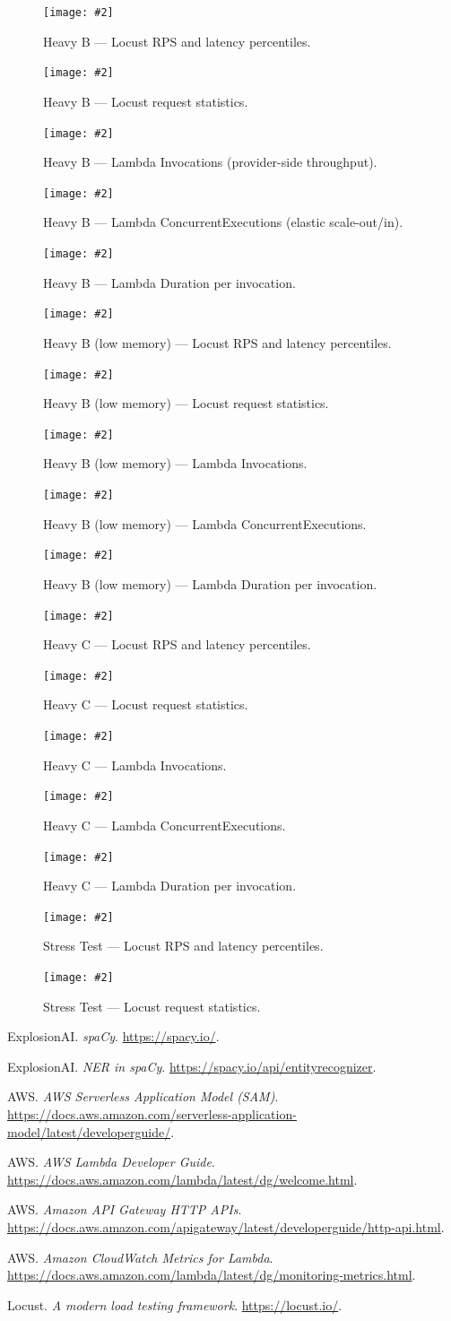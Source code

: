 \documentclass[11pt,a4paper]{article}
\newcommand{\scenariofig}[4][\linewidth]{%
  \begin{figure}[htbp]
    \centering
    \texttt{[image: \#2]}
    \caption{#3}
    \label{#4}
  \end{figure}%
}
\begin{document}
\scenariofig[0.8\textwidth]{figures/hB - Charts.png}{Heavy B — Locust RPS and latency percentiles.}{fig:hb-charts}
\scenariofig[0.9\textwidth]{figures/hB - Stats.png}{Heavy B — Locust request statistics.}{fig:hb-stats}
\scenariofig{figures/hB - Invocations.png}{Heavy B — Lambda Invocations (provider-side throughput).}{fig:hb-invocations}
\scenariofig{figures/hB - ConcEx.png}{Heavy B — Lambda ConcurrentExecutions (elastic scale-out/in).}{fig:hb-conc}
\scenariofig{figures/hB - Duration.png}{Heavy B — Lambda Duration per invocation.}{fig:hb-duration}

\scenariofig[0.8\textwidth]{figures/hBl - Charts.png}{Heavy B (low memory) — Locust RPS and latency percentiles.}{fig:hbl-charts}
\scenariofig[0.9\textwidth]{figures/hBl - Stats.png}{Heavy B (low memory) — Locust request statistics.}{fig:hbl-stats}
\scenariofig{figures/hBl - Invocations.png}{Heavy B (low memory) — Lambda Invocations.}{fig:hbl-invocations}
\scenariofig{figures/hBl - ConcEx.png}{Heavy B (low memory) — Lambda ConcurrentExecutions.}{fig:hbl-conc}
\scenariofig{figures/hBl - Duration.png}{Heavy B (low memory) — Lambda Duration per invocation.}{fig:hbl-duration}

\scenariofig[0.8\textwidth]{figures/hC - Charts.png}{Heavy C — Locust RPS and latency percentiles.}{fig:hc-charts}
\scenariofig[0.9\textwidth]{figures/hC - Stats.png}{Heavy C — Locust request statistics.}{fig:hc-stats}
\scenariofig{figures/hC - Invocations.png}{Heavy C — Lambda Invocations.}{fig:hc-invocations}
\scenariofig{figures/hC - ConcEx.png}{Heavy C — Lambda ConcurrentExecutions.}{fig:hc-conc}
\scenariofig{figures/hC - Duration.png}{Heavy C — Lambda Duration per invocation.}{fig:hc-duration}

\scenariofig[0.8\textwidth]{figures/hhA - Charts.png}{Stress Test — Locust RPS and latency percentiles.}{fig:hha-charts}
\scenariofig[0.9\textwidth]{figures/hhA - Stats.png}{Stress Test — Locust request statistics.}{fig:hha-stats}

\clearpage

\begin{thebibliography}{9}
ExplosionAI. \emph{spaCy}. \url{https://spacy.io/}.

ExplosionAI. \emph{NER in spaCy}. \url{https://spacy.io/api/entityrecognizer}.

AWS. \emph{AWS Serverless Application Model (SAM)}. \url{https://docs.aws.amazon.com/serverless-application-model/latest/developerguide/}.

AWS. \emph{AWS Lambda Developer Guide}. \url{https://docs.aws.amazon.com/lambda/latest/dg/welcome.html}.

AWS. \emph{Amazon API Gateway HTTP APIs}. \url{https://docs.aws.amazon.com/apigateway/latest/developerguide/http-api.html}.

AWS. \emph{Amazon CloudWatch Metrics for Lambda}. \url{https://docs.aws.amazon.com/lambda/latest/dg/monitoring-metrics.html}.

Locust. \emph{A modern load testing framework}. \url{https://locust.io/}.
\end{thebibliography}
\end{document}
